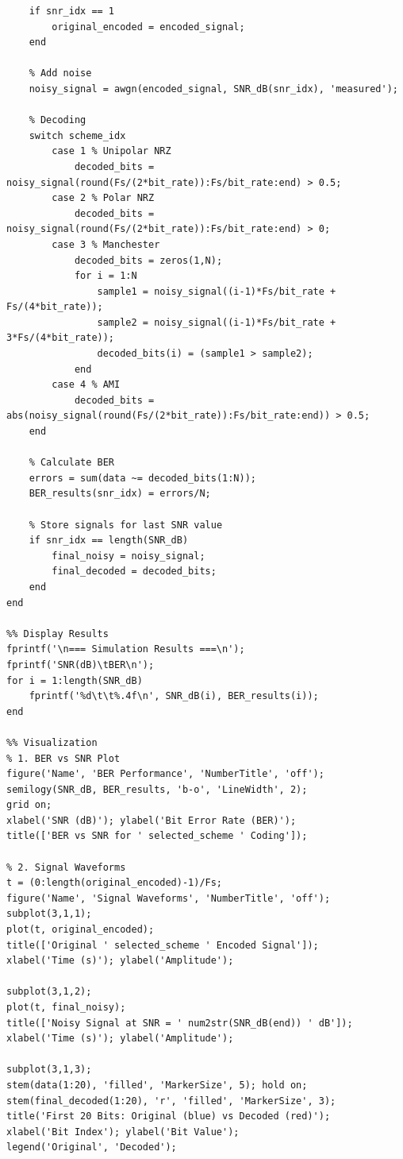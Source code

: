 \documentclass[12pt]{report}
\begin{document}
\begin{lstlisting}[style=matlabStyle, caption={}]
    % Store encoded signal for first SNR value
    if snr_idx == 1
        original_encoded = encoded_signal;
    end
    
    % Add noise
    noisy_signal = awgn(encoded_signal, SNR_dB(snr_idx), 'measured');
    
    % Decoding
    switch scheme_idx
        case 1 % Unipolar NRZ
            decoded_bits = noisy_signal(round(Fs/(2*bit_rate)):Fs/bit_rate:end) > 0.5;
        case 2 % Polar NRZ
            decoded_bits = noisy_signal(round(Fs/(2*bit_rate)):Fs/bit_rate:end) > 0;
        case 3 % Manchester
            decoded_bits = zeros(1,N);
            for i = 1:N
                sample1 = noisy_signal((i-1)*Fs/bit_rate + Fs/(4*bit_rate));
                sample2 = noisy_signal((i-1)*Fs/bit_rate + 3*Fs/(4*bit_rate));
                decoded_bits(i) = (sample1 > sample2);
            end
        case 4 % AMI
            decoded_bits = abs(noisy_signal(round(Fs/(2*bit_rate)):Fs/bit_rate:end)) > 0.5;
    end
    
    % Calculate BER
    errors = sum(data ~= decoded_bits(1:N));
    BER_results(snr_idx) = errors/N;
    
    % Store signals for last SNR value
    if snr_idx == length(SNR_dB)
        final_noisy = noisy_signal;
        final_decoded = decoded_bits;
    end
end

%% Display Results
fprintf('\n=== Simulation Results ===\n');
fprintf('SNR(dB)\tBER\n');
for i = 1:length(SNR_dB)
    fprintf('%d\t\t%.4f\n', SNR_dB(i), BER_results(i));
end

%% Visualization
% 1. BER vs SNR Plot
figure('Name', 'BER Performance', 'NumberTitle', 'off');
semilogy(SNR_dB, BER_results, 'b-o', 'LineWidth', 2);
grid on;
xlabel('SNR (dB)'); ylabel('Bit Error Rate (BER)');
title(['BER vs SNR for ' selected_scheme ' Coding']);

% 2. Signal Waveforms
t = (0:length(original_encoded)-1)/Fs;
figure('Name', 'Signal Waveforms', 'NumberTitle', 'off');
subplot(3,1,1);
plot(t, original_encoded);
title(['Original ' selected_scheme ' Encoded Signal']);
xlabel('Time (s)'); ylabel('Amplitude');

subplot(3,1,2);
plot(t, final_noisy);
title(['Noisy Signal at SNR = ' num2str(SNR_dB(end)) ' dB']);
xlabel('Time (s)'); ylabel('Amplitude');

subplot(3,1,3);
stem(data(1:20), 'filled', 'MarkerSize', 5); hold on;
stem(final_decoded(1:20), 'r', 'filled', 'MarkerSize', 3);
title('First 20 Bits: Original (blue) vs Decoded (red)');
xlabel('Bit Index'); ylabel('Bit Value');
legend('Original', 'Decoded');


\end{lstlisting}
\end{document}

